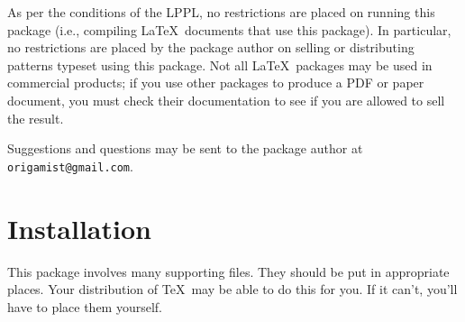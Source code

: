 \documentclass[draft]{amsart}
\begin{document}
As per the conditions of the LPPL, no restrictions are placed on running
this package (i.e., compiling \LaTeX\ documents that use this package).
In particular, no restrictions are placed by the package author on
selling or distributing patterns typeset using this package. Not
all \LaTeX\ packages may be used in commercial products; if you use
other packages to produce a PDF or paper document, you must check their
documentation to see if you are allowed to sell the result.

Suggestions and questions may be sent to the package author at 
\texttt{origamist@\allowbreak gmail.com}.

\section{Installation}

This package involves many supporting files. They should be put in
appropriate places. Your distribution of \TeX\ may be able to do this
for you. If it can't, you'll have to place them yourself.
\end{document}
